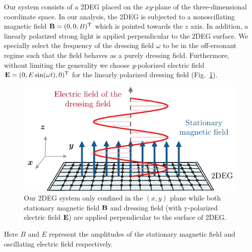 
Our system consists of a 2DEG placed on the $xy$-plane of the three-dimensional coordinate space. In our analysis, the 2DEG is subjected to a nonoscillating magnetic field $\vb{B} = (0,0,B)^{\text{T}}$ which is pointed towards the $z$ axis. In addition, a linearly polarized strong light is applied perpendicular to the 2DEG surface. We specially select the frequency of the dressing field $\omega$ to be in the off-ersonant regime such that the field behaves as a purely dressing field. Furthermore, without limiting the generality we choose $y$-polorized electric field $\vb{E} = (0,E\sin(\omega t),0)^{\text{T}}$ for the linearly polarized dressing field (Fig.~\ref{fig_1}).
\begin{figure}[b]
\includegraphics[scale=0.9]{figures/fig_1}
\caption{\label{fig_1} Our 2DEG system only confined in the $(x,y)$ plane while both stationary magnetic field $\vb{B}$ and dressing field (with y-polarized electric field $\vb{E}$) are applied perpendicular to the surface of 2DEG.}
\end{figure}
Here $B$ and $E$ represent the amplitudes of the stationary magnetic field and oscillating electric field respectively.

